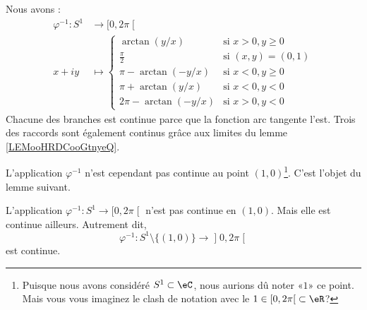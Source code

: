 Nous avons :
\begin{equation}        \label{EQooSAYFooRFVSPc}
	\begin{aligned}
		\varphi^{-1}\colon S^1 & \to \mathopen[ 0 , 2\pi \mathclose[ \\
		x+iy                   & \mapsto
		\begin{cases}
			\arctan(y/x)       & \text{si } x>0,y\geq 0 \\
			\frac{ \pi }{2}    & \text{si }(x,y)=(0,1)  \\
			\pi-\arctan(-y/x)  & \text{si }x<0,y\geq 0  \\
			\pi+\arctan(y/x)   & \text{si }x<0,y<0      \\
			2\pi-\arctan(-y/x) & \text{si }x>0,y<0
		\end{cases}
	\end{aligned}
\end{equation}
Chacune des branches est continue parce que la fonction arc tangente l'est. Trois des raccords sont également continus grâce aux limites du lemme \ref{LEMooHRDCooGtnyeQ}.

L'application \( \varphi^{-1}\) n'est cependant pas continue au point \( (1,0)\)\footnote{Puisque nous avons considéré \( S^1\subset \eC\), nous aurions dû noter «\( 1\)» ce point. Mais vous vous imaginez le clash de notation avec le \( 1\in \mathopen[ 0 , 2\pi \mathclose[\subset \eR\)?}. C'est l'objet du lemme suivant.

\begin{lemma}       \label{LEMooEQVRooMAffCw}
	L'application \( \varphi^{-1}\colon S^1\to \mathopen[ 0 , 2\pi \mathclose[\) n'est pas continue en \( (1,0)\). Mais elle est continue ailleurs. Autrement dit,
	\begin{equation}
		\varphi^{-1}\colon S^1\setminus\{ (1,0) \}\to \mathopen] 0 , 2\pi \mathclose[
	\end{equation}
	est continue.
\end{lemma}

